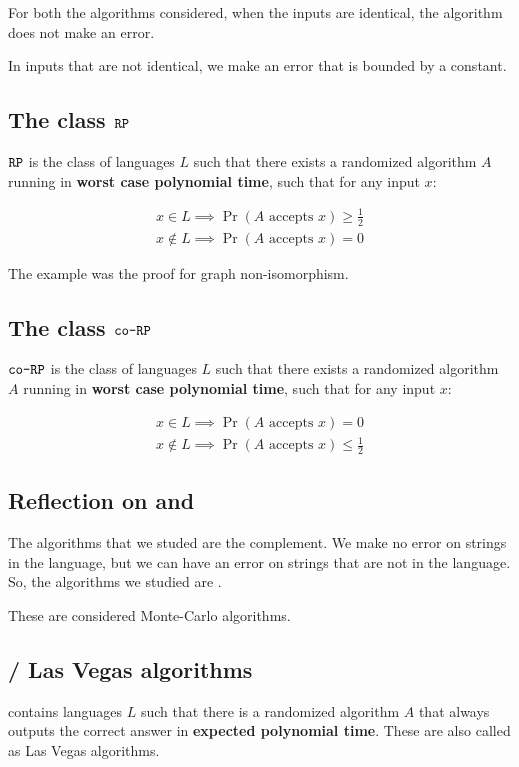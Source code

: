 For both the algorithms considered, when the inputs are identical, the
algorithm does not make an error.

In inputs that are not identical, we make an error that is bounded by a
constant.

\subsection{The class $\texttt{RP}$}
$\texttt{RP}$ is the class of languages $L$ such that there exists a randomized
algorithm $A$ running in \textbf{worst case polynomial time}, such that for any input
$x$:

\begin{align*}
x \in L \implies \Pr(\text{$A$ accepts $x$}) \geq \frac{1}{2} \\
x \notin L \implies \Pr(\text{$A$ accepts $x$}) = 0
\end{align*}

The example was the \ip proof for graph non-isomorphism.


\subsection{The class $\texttt{co-RP}$}
$\texttt{co-RP}$ is the class of languages $L$ such that there exists a randomized
algorithm $A$ running in \textbf{worst case polynomial time}, such that for any input
$x$:

\begin{align*}
x \in L \implies \Pr(\text{$A$ accepts $x$})  = 0 \\
x \notin L \implies \Pr(\text{$A$ accepts $x$}) \leq \frac{1}{2}
\end{align*}


\subsection{Reflection on \rp and \corp}

The algorithms that we studed are the complement. We make no error
on strings in the language, but we can have an error on strings that are 
not in the language. So, the algorithms we studied are \corp.

These are considered Monte-Carlo algorithms.


\subsection{\zp / Las Vegas algorithms}
\zp contains languages $L$ such that there is a randomized algorithm $A$
that always outputs the correct answer in \textbf{expected polynomial time}.  
These are also called as Las Vegas algorithms.


